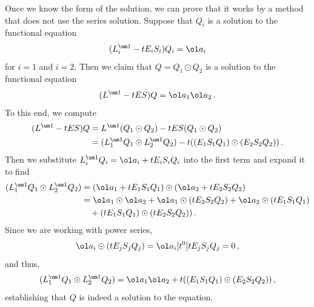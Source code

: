 \begin{example} Once we know the form of the solution, we can prove that it works by a method that does not use the series solution. Suppose that $Q_i$ is a solution to the functional equation
\begin{align}
	(L_i^{\um 1} - tE_iS_i)Q_i = \ol a_i
\end{align}
for $i = 1$ and $i = 2$. Then we claim that $Q = Q_1 \odot Q_2$ is a solution to the functional equation
\begin{align}
	(L^{\um 1} - tES)Q = \ol a_1\ol a_2\,.
\end{align}
To this end, we compute
\begin{align}\begin{split}
	(L^{\um 1}-tES)Q &= L^{\um 1} (Q_1\odot Q_2) - tES(Q_1\odot Q_2)\\
	& = (L^{\um 1}_1Q_1\odot L^{\um 1}_2Q_2) - t((E_1S_1Q_1)\odot (E_2S_2Q_2))\,.
\end{split}\end{align}
Then we substitute $ L^{\um 1}_i Q_i = \ol a_i + tE_iS_iQ_i$ into the first term and expand it to find
\begin{align}\begin{split}
	 (L^{\um 1}_1Q_1\odot L^{\um 1}_2Q_2) &= (\ol a_1+ t E_1 S_1 Q_1)\odot(\ol a_2 + t E_2 S_2 Q_2)\\
	 & = \ol a_1\odot\ol a_2 + \ol a_1\odot (t E_2 S_2 Q_2) + \ol a_2\odot(t E_1 S_1 Q_1) \\
	 &\quad+ (t E_1 S_1 Q_1)\odot(t E_2 S_2 Q_2))\,.
\end{split}\end{align}
Since we are working with power series,
\begin{align}
	\ol a_i\odot (t E_j S_j Q_j) = \ol a_i [t^0]t E_j S_j Q_j = 0\,,
\end{align}
and thus,
\begin{align}
	(L^{\um 1}_1Q_1\odot L^{\um 1}_2Q_2) =  \ol a_1\ol a_2 +t ((E_1 S_1 Q_1)\odot (E_2 S_2 Q_2))\,,
\end{align}
establishing that $Q$ is indeed a solution to the equation.
\end{example}

